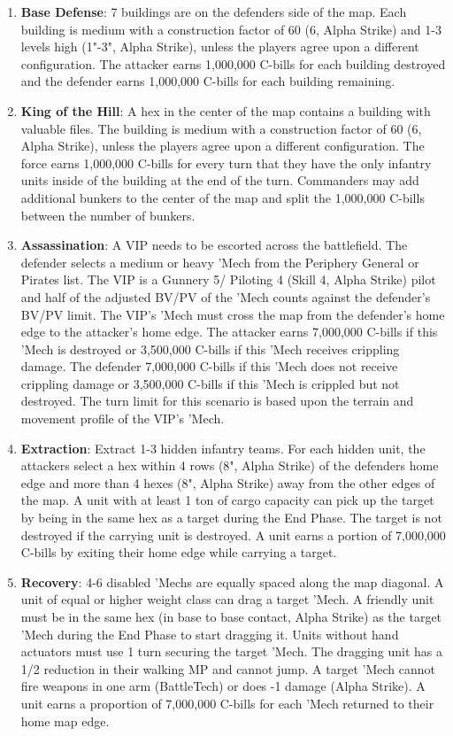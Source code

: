 \begin{enumerate}
\item {\bfseries Base Defense}: 7 buildings are on the defenders side of the map.
Each building is medium with a construction factor of 60 (6, Alpha Strike) and 1-3 levels high (1"-3", Alpha Strike), unless the players agree upon a different configuration.
The attacker earns 1,000,000 C-bills for each building destroyed and the defender earns 1,000,000 C-bills for each building remaining.

\item {\bfseries King of the Hill}: A hex in the center of the map contains a building with valuable files.
The building is medium with a construction factor of 60 (6, Alpha Strike), unless the players agree upon a different configuration.
The force earns 1,000,000 C-bills for every turn that they have the only infantry units inside of the building at the end of the turn.
Commanders may add additional bunkers to the center of the map and split the 1,000,000 C-bills between the number of bunkers.

\item {\bfseries Assassination}: A VIP needs to be escorted across the battlefield.
The defender selects a medium or heavy 'Mech from the Periphery General or Pirates list.
The VIP is a Gunnery 5/ Piloting 4 (Skill 4, Alpha Strike) pilot and half of the adjusted BV/PV of the 'Mech counts against the defender's BV/PV limit.
The VIP's 'Mech must cross the map from the defender's home edge to the attacker's home edge.
The attacker earns 7,000,000 C-bills if this 'Mech is destroyed or 3,500,000 C-bills if this 'Mech receives crippling damage.
The defender 7,000,000 C-bills if this 'Mech does not receive crippling damage or 3,500,000 C-bills if this 'Mech is crippled but not destroyed.
The turn limit for this scenario is based upon the terrain and movement profile of the VIP's 'Mech.

\item {\bfseries Extraction}: Extract 1-3 hidden infantry teams.
For each hidden unit, the attackers select a hex within 4 rows (8", Alpha Strike) of the defenders home edge and more than 4 hexes (8", Alpha Strike) away from the other edges of the map.
A unit with at least 1 ton of cargo capacity can pick up the target by being in the same hex as a target during the End Phase.
The target is not destroyed if the carrying unit is destroyed.
A unit earns a portion of 7,000,000 C-bills by exiting their home edge while carrying a target.

\item {\bfseries Recovery}: 4-6 disabled 'Mechs are equally spaced along the map diagonal.
A unit of equal or higher weight class can drag a target 'Mech.
A friendly unit must be in the same hex (in base to base contact, Alpha Strike) as the target 'Mech during the End Phase to start dragging it.
Units without hand actuators must use 1 turn securing the target 'Mech.
The dragging unit has a 1/2 reduction in their walking MP and cannot jump.
A target 'Mech cannot fire weapons in one arm (BattleTech) or does -1 damage (Alpha Strike).
A unit earns a proportion of 7,000,000 C-bills for each 'Mech returned to their home map edge.

\end{enumerate}
